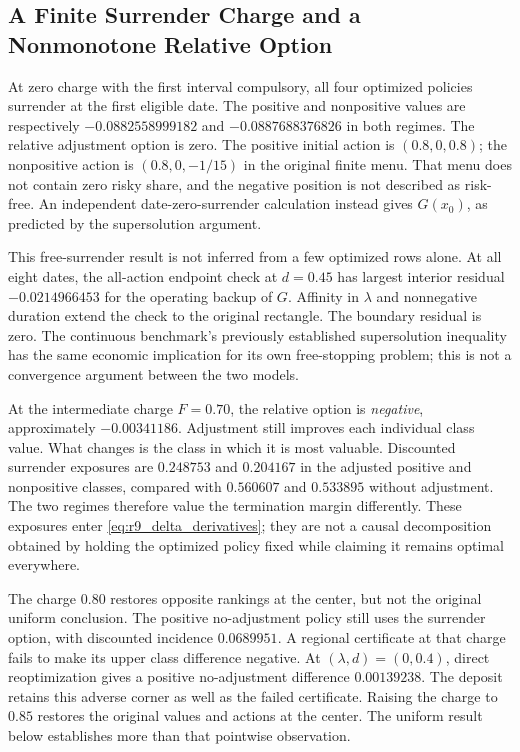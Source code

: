 \subsection{A Finite Surrender Charge and a Nonmonotone Relative Option}

At zero charge with the first interval compulsory, all four optimized policies surrender at the first eligible date. The positive and nonpositive values are respectively $-0.0882558999182$ and $-0.0887688376826$ in both regimes. The relative adjustment option is zero. The positive initial action is $(0.8,0,0.8)$; the nonpositive action is $(0.8,0,-1/15)$ in the original finite menu. That menu does not contain zero risky share, and the negative position is not described as risk-free. An independent date-zero-surrender calculation instead gives $G(x_0)$, as predicted by the supersolution argument.

This free-surrender result is not inferred from a few optimized rows alone. At all eight dates, the all-action endpoint check at $d=0.45$ has largest interior residual $-0.0214966453$ for the operating backup of $G$. Affinity in $\lambda$ and nonnegative duration extend the check to the original rectangle. The boundary residual is zero. The continuous benchmark's previously established supersolution inequality has the same economic implication for its own free-stopping problem; this is not a convergence argument between the two models.

At the intermediate charge $F=0.70$, the relative option is \emph{negative}, approximately $-0.00341186$. Adjustment still improves each individual class value. What changes is the class in which it is most valuable. Discounted surrender exposures are $0.248753$ and $0.204167$ in the adjusted positive and nonpositive classes, compared with $0.560607$ and $0.533895$ without adjustment. The two regimes therefore value the termination margin differently. These exposures enter \eqref{eq:r9_delta_derivatives}; they are not a causal decomposition obtained by holding the optimized policy fixed while claiming it remains optimal everywhere.

The charge $0.80$ restores opposite rankings at the center, but not the original uniform conclusion. The positive no-adjustment policy still uses the surrender option, with discounted incidence $0.0689951$. A regional certificate at that charge fails to make its upper class difference negative. At $(\lambda,d)=(0,0.4)$, direct reoptimization gives a positive no-adjustment difference $0.00139238$. The deposit retains this adverse corner as well as the failed certificate. Raising the charge to $0.85$ restores the original values and actions at the center. The uniform result below establishes more than that pointwise observation.

